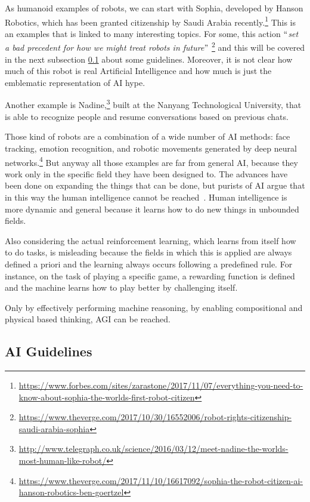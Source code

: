 As humanoid examples of robots, we can start with Sophia, developed by Hanson Robotics, which has been granted citizenship by Saudi Arabia recently.\footnote{\url{https://www.forbes.com/sites/zarastone/2017/11/07/everything-you-need-to-know-about-sophia-the-worlds-first-robot-citizen}} This is an examples that is linked to many interesting topics. For some, this action $``$\textit{set a bad precedent for how we might treat robots in future}$"$ \footnote{\url{https://www.theverge.com/2017/10/30/16552006/robot-rights-citizenship-saudi-arabia-sophia}} and this will be covered in the next subsection \ref{aiGuidelines} about some guidelines. Moreover, it is not clear how much of this robot is real Artificial Intelligence and how much is just the emblematic representation of AI hype.

Another example is Nadine,\footnote{\url{http://www.telegraph.co.uk/science/2016/03/12/meet-nadine-the-worlds-most-human-like-robot/}} built at the Nanyang Technological University, that is able to recognize people and resume conversations based on previous chats.

Those kind of robots are a combination of a wide number of AI methods: face tracking, emotion recognition, and robotic movements generated by deep neural networks.\footnote{\url{https://www.theverge.com/2017/11/10/16617092/sophia-the-robot-citizen-ai-hanson-robotics-ben-goertzel}} But anyway all those examples are far from general AI, because they work only in the specific field they have been designed to. The advances have been done on expanding the things that can be done, but purists of AI argue that in this way the human intelligence cannot be reached~\cite{pearl2018theoretical}. Human intelligence is more dynamic and general because it learns how to do new things in unbounded fields.

Also considering the actual reinforcement learning, which learns from itself how to do tasks, is misleading because the fields in which this is applied are always defined a priori and the learning always occurs following a predefined rule. For instance, on the task of playing a specific game, a rewarding function is defined and the machine learns how to play better by challenging itself.

Only by effectively performing machine reasoning, by enabling compositional and physical based thinking, AGI can be reached.

\subsection{AI Guidelines}
\label{aiGuidelines}

